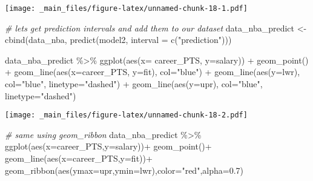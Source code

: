 \documentclass[
]{book}
\newenvironment{Shaded}{\begin{snugshade}}{\end{snugshade}}
\newcommand{\AttributeTok}[1]{\textcolor[rgb]{0.77,0.63,0.00}{#1}}
\newcommand{\CommentTok}[1]{\textcolor[rgb]{0.56,0.35,0.01}{\textit{#1}}}
\newcommand{\FloatTok}[1]{\textcolor[rgb]{0.00,0.00,0.81}{#1}}
\newcommand{\FunctionTok}[1]{\textcolor[rgb]{0.00,0.00,0.00}{#1}}
\newcommand{\NormalTok}[1]{#1}
\newcommand{\OtherTok}[1]{\textcolor[rgb]{0.56,0.35,0.01}{#1}}
\newcommand{\SpecialCharTok}[1]{\textcolor[rgb]{0.00,0.00,0.00}{#1}}
\newcommand{\StringTok}[1]{\textcolor[rgb]{0.31,0.60,0.02}{#1}}
\begin{document}
\texttt{[image: \_main\_files/figure-latex/unnamed-chunk-18-1.pdf]}

\begin{Shaded}
\begin{Highlighting}[]
\CommentTok{\# let\textquotesingle{}s get prediction intervals and add them to our dataset}
\NormalTok{data\_nba\_predict }\OtherTok{\textless{}{-}} \FunctionTok{cbind}\NormalTok{(data\_nba, }\FunctionTok{predict}\NormalTok{(model2, }\AttributeTok{interval =} \FunctionTok{c}\NormalTok{(}\StringTok{"prediction"}\NormalTok{)))}

\NormalTok{data\_nba\_predict }\SpecialCharTok{\%\textgreater{}\%}
  \FunctionTok{ggplot}\NormalTok{(}\FunctionTok{aes}\NormalTok{(}\AttributeTok{x=}\NormalTok{ career\_PTS, }\AttributeTok{y=}\NormalTok{salary)) }\SpecialCharTok{+}
  \FunctionTok{geom\_point}\NormalTok{() }\SpecialCharTok{+}
  \FunctionTok{geom\_line}\NormalTok{(}\FunctionTok{aes}\NormalTok{(}\AttributeTok{x=}\NormalTok{career\_PTS, }\AttributeTok{y=}\NormalTok{fit),}
            \AttributeTok{col=}\StringTok{"blue"}\NormalTok{) }\SpecialCharTok{+}
  \FunctionTok{geom\_line}\NormalTok{(}\FunctionTok{aes}\NormalTok{(}\AttributeTok{y=}\NormalTok{lwr),}
                \AttributeTok{col=}\StringTok{"blue"}\NormalTok{,}
                \AttributeTok{linetype=}\StringTok{"dashed"}\NormalTok{) }\SpecialCharTok{+}
  \FunctionTok{geom\_line}\NormalTok{(}\FunctionTok{aes}\NormalTok{(}\AttributeTok{y=}\NormalTok{upr),}
                \AttributeTok{col=}\StringTok{"blue"}\NormalTok{,}
                \AttributeTok{linetype=}\StringTok{"dashed"}\NormalTok{)}
\end{Highlighting}
\end{Shaded}

\texttt{[image: \_main\_files/figure-latex/unnamed-chunk-18-2.pdf]}

\begin{Shaded}
\begin{Highlighting}[]
\CommentTok{\# same using geom\_ribbon}
\NormalTok{data\_nba\_predict }\SpecialCharTok{\%\textgreater{}\%}
\FunctionTok{ggplot}\NormalTok{(}\FunctionTok{aes}\NormalTok{(}\AttributeTok{x=}\NormalTok{career\_PTS,}\AttributeTok{y=}\NormalTok{salary))}\SpecialCharTok{+}
  \FunctionTok{geom\_point}\NormalTok{()}\SpecialCharTok{+}
  \FunctionTok{geom\_line}\NormalTok{(}\FunctionTok{aes}\NormalTok{(}\AttributeTok{x=}\NormalTok{career\_PTS,}\AttributeTok{y=}\NormalTok{fit))}\SpecialCharTok{+}
  \FunctionTok{geom\_ribbon}\NormalTok{(}\FunctionTok{aes}\NormalTok{(}\AttributeTok{ymax=}\NormalTok{upr,}\AttributeTok{ymin=}\NormalTok{lwr),}\AttributeTok{color=}\StringTok{"red"}\NormalTok{,}\AttributeTok{alpha=}\FloatTok{0.7}\NormalTok{)}
\end{Highlighting}
\end{Shaded}
\end{document}
